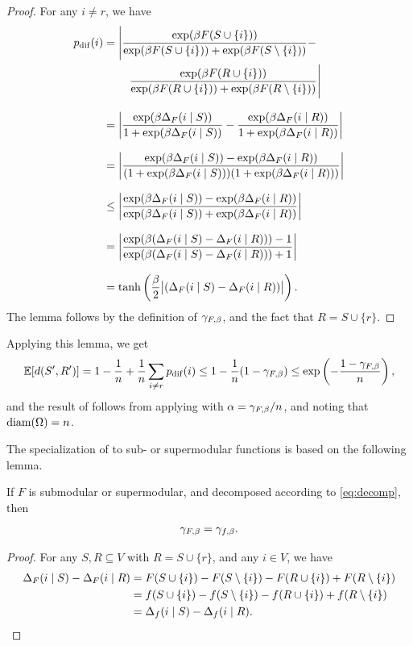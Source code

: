 \begin{proof}
  For any $i \neq r$, we have
  \begin{align*}
    p_{\mathrm{dif}}(i) &= \Bigg|\frac{\exp(\beta F(S \cup \{i\}))}{\exp(\beta F(S \cup \{i\})) + \exp(\beta F(S \setminus \{i\}))} -\\
    &\ \ \ \ \ \ \ \frac{\exp(\beta F(R \cup \{i\}))}{\exp(\beta F(R \cup \{i\})) + \exp(\beta F(R \setminus \{i\}))}\Bigg|\\[0.8em]
    &= \left|\frac{\exp(\beta \D_F(i\mid S))}{1 + \exp(\beta \D_F(i\mid S))} - \frac{\exp(\beta \D_F(i\mid R))}{1 + \exp(\beta \D_F(i\mid R))}\right|\\[0.8em]
    &= \left|\frac{\exp(\beta \D_F(i\mid S)) - \exp(\beta \D_F(i\mid R))}{(1 + \exp(\beta \D_F(i\mid S)))(1 + \exp(\beta \D_F(i\mid R)))}\right|\\[0.8em]
    &\leq \left|\frac{\exp(\beta \D_F(i\mid S)) - \exp(\beta \D_F(i\mid R))}{\exp(\beta \D_F(i\mid S)) + \exp(\beta \D_F(i\mid R))}\right|\\[0.8em]
    &= \left|\frac{\exp(\beta (\D_F(i\mid S) - \D_F(i\mid R))) - 1}{\exp(\beta (\D_F(i\mid S) - \D_F(i\mid R))) + 1}\right|\\[0.8em]
    &= \tanh \left(\frac{\beta}{2}\big|(\D_F(i\mid S) - \D_F(i\mid R)) \big|\right).
  \end{align*}
  The lemma follows by the definition of $\gf$, and the fact that $R = S \cup \{r\}$.
\end{proof}
\noindent Applying this lemma, we get
\begin{align*}
  \E[d(S', R')] = 1 -\frac{1}{n} + \frac{1}{n}\sum_{i \neq r}p_{\mathrm{dif}}(i) \leq 1 - \frac{1}{n}(1 - \gf) \leq \exp\left(-\frac{1-\gf}{n}\right),
\end{align*}
and the result of  follows from applying  with $\alpha = \gf/n$, and noting that $\mathrm{diam}(\ss) = n$.

The specialization of  to sub- or supermodular functions is based on the following lemma.
\begin{lemma}
  If $F$ is submodular or supermodular, and decomposed according to \eqref{eq:decomp}, then
  \begin{align*}
    \gf = \gsf.
  \end{align*}
\end{lemma}

\begin{proof}
  For any $S, R \subseteq V$ with $R = S \cup \{r\}$, and any $i \in V$, we have
  \begin{align*}
    \D_F(i\mid S) - \D_F(i\mid R) &= F(S \cup \{i\}) - F(S \setminus \{i\}) - F(R \cup \{i\}) + F(R \setminus \{i\})\\
    &= f(S \cup \{i\}) - f(S \setminus \{i\}) - f(R \cup \{i\}) + f(R \setminus \{i\})\\
    &= \D_f(i\mid S) - \D_f(i\mid R).
  \end{align*}
\end{proof}

